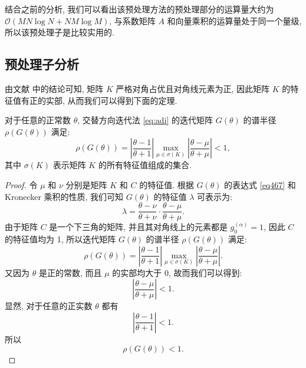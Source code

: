\documentclass{ecnumaster}
\begin{document}
结合之前的分析,
我们可以看出该预处理方法的预处理部分的运算量大约为
 $\mathcal{O}(MN\log N + NM\log M)$,
与系数矩阵 $A$ 和向量乘积的运算量处于同一个量级,
所以该预处理子是比较实用的.

\subsection{预处理子分析}
由文献 \cite{WWS10} 中的结论可知, 矩阵 $K$ 严格对角占优且对角线元素为正,
因此矩阵 $K$ 的特征值有正的实部, 从而我们可以得到下面的定理.

\begin{theorem}\label{th411}
  对于任意的正常数 $\theta$, 交替方向迭代法 \eqref{eq:adi}
  的迭代矩阵 $G(\theta)$ 的谱半径 $\rho (G(\theta))$ 满足:
  $$
    \rho (G(\theta))
    = \left| \frac{\theta -1}{\theta +1} \right|
    \max _{\mu \in \sigma (K)} \left| \frac{\theta - \mu}{\theta + \mu} \right| < 1,
  $$
  其中 $\sigma (K)$ 表示矩阵 $K$ 的所有特征值组成的集合.
\end{theorem}
\begin{proof}
  令 $\mu$ 和 $\nu$ 分别是矩阵 $K$ 和 $C$ 的特征值.
  根据 $G(\theta)$ 的表达式 \eqref{eq467} 和 Kronecker 乘积的性质, 
  我们可知 $G(\theta)$ 的特征值 $\lambda$ 可表示为:
  $$
    \lambda = \frac{\theta - \nu}{\theta + \nu} \cdot \frac{\theta - \mu}{\theta + \mu}.
  $$
  由于矩阵 $C$ 是一个下三角的矩阵,
  并且其对角线上的元素都是 $g_0^{(\alpha)} = 1$,
  因此 $C$ 的特征值均为 1, 所以迭代矩阵 $G(\theta)$ 的谱半径 $\rho (G(\theta))$ 满足:
  $$
    \rho (G(\theta)) = \left| \frac{\theta -1}{\theta + 1} \right|
    \max_{\mu \in \sigma (K)} \left| \frac{\theta - \mu}{\theta + \mu} \right|.
  $$
  又因为 $\theta$ 是正的常数, 而且 $\mu$ 的实部均大于 $0$, 故而我们可以得到:
  $$
    \left| \frac{\theta - \mu}{\theta + \mu}\right| < 1.
  $$
  显然, 对于任意的正实数 $\theta$ 都有
  $$
    \left| \frac{\theta - 1}{\theta + 1} \right| < 1.
  $$
  所以
  $$
    \rho (G(\theta)) < 1.
  $$
\end{proof}
\end{document}
